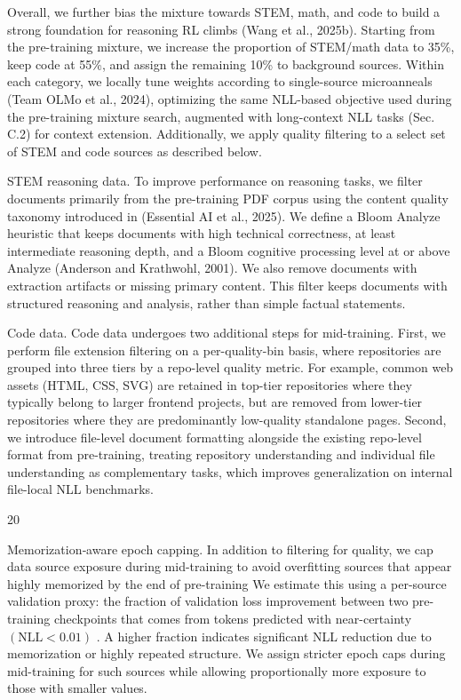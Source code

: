 \documentclass[
  10
]{article}
\begin{document}
Overall, we further bias the mixture towards STEM, math, and code to
build a strong foundation for reasoning RL climbs (Wang et al., 2025b).
Starting from the pre-training mixture, we increase the proportion of
STEM/math data to 35\%, keep code at 55\%, and assign the remaining 10\%
to background sources. Within each category, we locally tune weights
according to single-source microanneals (Team OLMo et al., 2024),
optimizing the same NLL-based objective used during the pre-training
mixture search, augmented with long-context NLL tasks (Sec. C.2) for
context extension. Additionally, we apply quality filtering to a select
set of STEM and code sources as described below.

STEM reasoning data. To improve performance on reasoning tasks, we
filter documents primarily from the pre-training PDF corpus using the
content quality taxonomy introduced in (Essential AI et al., 2025). We
define a Bloom Analyze heuristic that keeps documents with high
technical correctness, at least intermediate reasoning depth, and a
Bloom cognitive processing level at or above Analyze (Anderson and
Krathwohl, 2001). We also remove documents with extraction artifacts or
missing primary content. This filter keeps documents with structured
reasoning and analysis, rather than simple factual statements.

Code data. Code data undergoes two additional steps for mid-training.
First, we perform file extension filtering on a per-quality-bin basis,
where repositories are grouped into three tiers by a repo-level quality
metric. For example, common web assets (HTML, CSS, SVG) are retained in
top-tier repositories where they typically belong to larger frontend
projects, but are removed from lower-tier repositories where they are
predominantly low-quality standalone pages. Second, we introduce
file-level document formatting alongside the existing repo-level format
from pre-training, treating repository understanding and individual file
understanding as complementary tasks, which improves generalization on
internal file-local NLL benchmarks.

20

Memorization‐aware epoch capping. In addition to filtering for quality,
we cap data source exposure during mid-training to avoid overfitting
sources that appear highly memorized by the end of pre-training We
estimate this using a per-source validation proxy: the fraction of
validation loss improvement between two pre-training checkpoints that
comes from tokens predicted with near-certainty
\(\left( \mathrm { N L L } < 0 . 0 1 \right)\) . A higher fraction
indicates significant NLL reduction due to memorization or highly
repeated structure. We assign stricter epoch caps during mid-training
for such sources while allowing proportionally more exposure to those
with smaller values.
\end{document}
